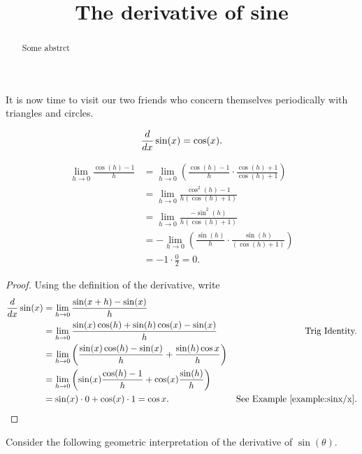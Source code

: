 \documentclass{ximera}
\title[Dig In:]{The derivative of sine}
\begin{document}
\begin{abstract}
  Some abstrct
\end{abstract}
\maketitle

It is now time to visit our two friends who concern themselves
periodically with triangles and circles.

\begin{theorem}\label{theorem:deriv sin}
\[
\frac{d}{dx} \sin(x) = \cos(x).
\]
\end{theorem}

\begin{align*}
\lim_{h\to 0}\frac{\cos(h)-1}{h} &= \lim_{h\to 0}\left(\frac{\cos(h)-1}{h}\cdot\frac{\cos(h)+1}{\cos(h)+1}\right)\\
&=\lim_{h\to 0}\frac{\cos^2(h)-1}{h(\cos(h)+1)}\\
&=\lim_{h\to 0}\frac{-\sin^2(h)}{h(\cos(h)+1)}\\
&=-\lim_{h\to 0}\left(\frac{\sin(h)}{h}\cdot\frac{\sin(h)}{(\cos(h)+1)}\right)\\
&= -1 \cdot \frac{0}{2} = 0.
\end{align*}

\begin{proof}
Using the definition of the derivative, write
\begin{align*}
\ddx \sin(x) &= \lim_{h\to0} \frac{\sin(x+h)-\sin(x)}{h} \\
&= \lim_{h\to0} \frac{\sin(x)\cos(h)+\sin(h)\cos(x)-\sin(x)}{h}  & \text{Trig Identity.}\\
&= \lim_{h\to0} \left(\frac{\sin(x)\cos(h)-\sin(x)}{h} + \frac{\sin(h)\cos{x}}{h} \right)\\
&=\lim_{h\to0} \left(\sin (x)\frac{\cos(h) - 1}{h}+\cos(x)\frac{\sin(h)}{h}\right) \\
&=\sin(x) \cdot 0 + \cos(x) \cdot 1 = \cos x. & \text{See Example~\ref{example:sinx/x}.}
\end{align*}
\end{proof}

Consider the following geometric interpretation of the derivative of
$\sin(\theta)$.  
\end{document}
